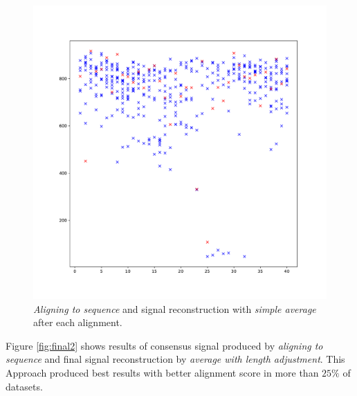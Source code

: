 \begin{figure}
  \centering
  \includegraphics[width=1.0\textwidth]{images/final3}
  \caption{\textit{Aligning to sequence} and signal reconstruction with \textit{simple average} after each alignment.}
  \label{fig:final3}
\end{figure}

Figure \ref{fig:final2} shows results of consensus signal produced by \textit{aligning to sequence} and
final signal reconstruction by \textit{average with length adjustment}. This Approach produced best results with better alignment
score in more than $25\%$ of datasets.

